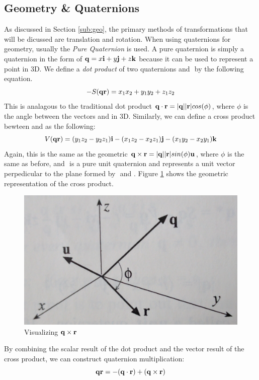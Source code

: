 \subsection{Geometry \& Quaternions}
As discussed in Section \ref{sub:geo}, the primary methods of transformations that will be dicussed are translation and rotation.
When using quaternions for geometry, usually the \textit{Pure Quaternion} is used.
A pure quaternion is simply a quaternion in the form of $\text{\textbf{q}} = x\text{\textbf{i}} + y\text{\textbf{j}} + z\text{\textbf{k}}$ because it can be used to represent a point in 3D.
We define a \textit{dot product} of two quaternions \qq and \qr$ $ by the following equation.
\begin{equation}
-S(\text{\textbf{q}}\text{\textbf{r}}) = x_1x_2 + y_1y_2 + z_1z_2
\end{equation}
This is analagous to the traditional dot product $\text{\textbf{q}} \cdot \text{\textbf{r}} = \lvert\text{\textbf{q}}\rvert\lvert\text{\textbf{r}}\rvert cos(\phi)$, where $\phi$ is the angle between the vectors \qq and \qr in 3D.
Similarly, we can define a cross product bewteen \qq and \qr as the following:
\begin{equation}
V(\text{\textbf{q}}\text{\textbf{r}}) = (y_1z_2 - y_2z_1)\text{\textbf{i}} - (x_1z_2 - x_2z_1)\text{\textbf{j}} -(x_1y_2-x_2y_1)\text{\textbf{k}}
\end{equation}
Again, this is the same as the geometric $\text{\textbf{q}} \times \text{\textbf{r}} = \lvert\text{\textbf{q}}\rvert\lvert\text{\textbf{r}}\rvert sin(\phi)\text{\textbf{u}}$, where $\phi$ is the same as before, and \qu$ $ is a pure unit quaternion and represents a unit vector perpedicular to the plane formed by \qq$ $ and \qr.
Figure \ref{fig:cross} shows the geometric representation of the cross product.

\begin{figure}[H]
\centering
\includegraphics[width = .75\textwidth]{Figures/cross_product}
\caption{Visualizing $\text{\textbf{q}} \times \text{\textbf{r}}$}
\label{fig:cross}
\end{figure}

By combining the scalar result of the dot product and the vector result of the cross product, we can construct quaternion multiplication:
\begin{equation}
\label{eq:mult}
\text{\textbf{q}}\text{\textbf{r}} = -(\text{\textbf{q}} \cdot \text{\textbf{r}}) + (\text{\textbf{q}} \times \text{\textbf{r}})
\end{equation}

